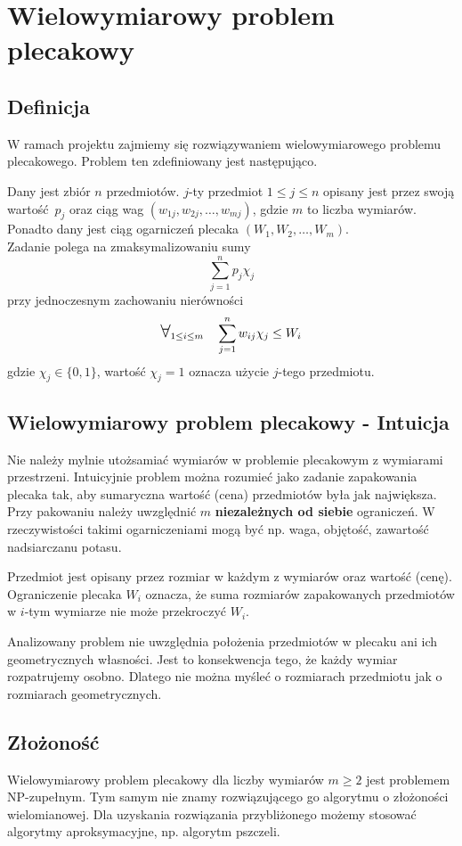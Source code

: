 \documentclass[a4paper,12pt,notitlepage]{mwrep}
\begin{document}
\section{Wielowymiarowy problem plecakowy}
\subsection{Definicja}
W ramach projektu zajmiemy się rozwiązywaniem wielowymiarowego problemu plecakowego.
Problem ten zdefiniowany jest następująco.

Dany jest zbiór $n$ przedmiotów. $j$-ty przedmiot $1 \le j \le n$
opisany jest przez swoją wartość~$p_j$ oraz ciąg wag
$(w_{1j}, w_{2j}, \dots, w_{mj})$, gdzie $m$ to liczba wymiarów.\\
Ponadto dany jest ciąg ogarniczeń plecaka $(W_1, W_2, \dots, W_m)$.\\
Zadanie polega na zmaksymalizowaniu sumy
$$ \sum_{j=1}^n p_j\chi_j$$
przy jednoczesnym zachowaniu nierówności
$$\bigforall_{1 \le i \le m}\quad\sum_{j=1}^n w_{ij}\chi_j \le W_i$$
gdzie $\chi_j \in \{0, 1\}$, wartość $\chi_j=1$
oznacza użycie $j$-tego przedmiotu.

\subsection{Wielowymiarowy problem plecakowy - Intuicja}
Nie należy mylnie utożsamiać wymiarów w problemie plecakowym z 
wymiarami przestrzeni. Intuicyjnie problem można rozumieć jako zadanie
zapakowania plecaka tak, aby sumaryczna wartość (cena)
przedmiotów była jak największa.
Przy pakowaniu należy uwzględnić $m$ \textbf{niezależnych od siebie}
ograniczeń. W rzeczywistości takimi ogarniczeniami mogą być np. waga,
objętość, zawartość nadsiarczanu potasu.

Przedmiot jest opisany przez
rozmiar w każdym z wymiarów oraz wartość (cenę). Ograniczenie plecaka
$W_i$ oznacza, że suma rozmiarów zapakowanych przedmiotów w $i$-tym
wymiarze nie może przekroczyć $W_i$.

Analizowany problem nie uwzględnia położenia przedmiotów w plecaku
ani ich geometrycznych własności. Jest to konsekwencja tego, że każdy
wymiar rozpatrujemy osobno. Dlatego nie można myśleć o rozmiarach
przedmiotu jak o rozmiarach geometrycznych.

\subsection{Złożoność}
Wielowymiarowy problem plecakowy dla liczby wymiarów $m \ge 2$ jest
problemem NP-zupełnym. Tym samym nie znamy rozwiązującego go
algorytmu o złożoności wielomianowej. Dla uzyskania rozwiązania
przybliżonego możemy stosować algorytmy aproksymacyjne, np. algorytm
pszczeli.
\end{document}
